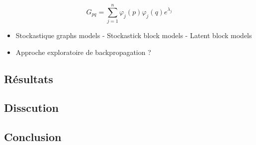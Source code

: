 \documentclass[
]{article}
\providecommand{\tightlist}{%
  \setlength{\itemsep}{0pt}\setlength{\parskip}{0pt}}
\begin{document}
\[G_{pq}=\sum^n_{j=1}\varphi_j(p)\varphi_j(q)e^{\lambda_j}\]

\begin{itemize}
\tightlist
\item
  Stockastique graphs models - Stockastick block models - Latent block
  models
\item
  Approche exploratoire de backpropagation ?
\end{itemize}

\hypertarget{ruxe9sultats}{%
\subsection{Résultats}\label{ruxe9sultats}}

\hypertarget{disscution}{%
\subsection{Disscution}\label{disscution}}

\hypertarget{conclusion}{%
\subsection{Conclusion}\label{conclusion}}
\end{document}
